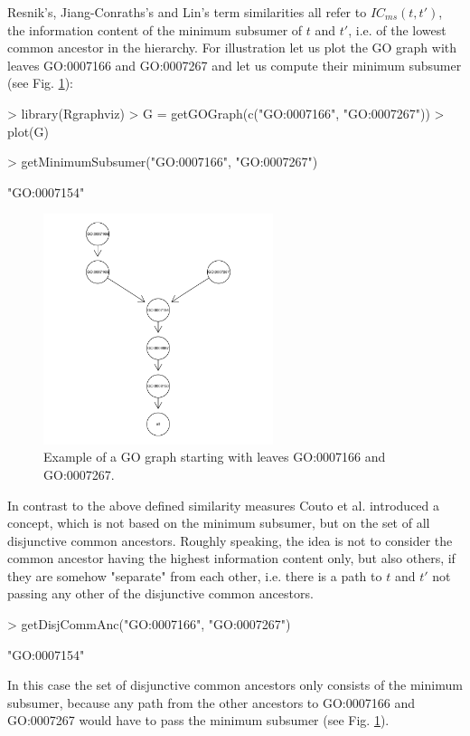 \documentclass[12pt,a4paper]{article}
\begin{document}
Resnik's, Jiang-Conraths's and Lin's term similarities all refer to $IC_{ms}(t,t')$, the information content of the minimum subsumer of $t$ and $t'$, i.e. of the lowest common ancestor in the hierarchy. For illustration let us plot the GO graph with leaves GO:0007166 and GO:0007267 and let us compute their minimum subsumer (see Fig. \ref{Fig:GOPlot}):
\begin{Schunk}
\begin{Sinput}
> library(Rgraphviz)
> G = getGOGraph(c("GO:0007166", "GO:0007267"))
> plot(G)
\end{Sinput}
\end{Schunk}
\begin{Schunk}
\begin{Sinput}
> getMinimumSubsumer("GO:0007166", "GO:0007267")
\end{Sinput}
\begin{Soutput}
[1] "GO:0007154"
\end{Soutput}
\end{Schunk}

\begin{figure}
\begin{center}
\includegraphics[width=0.6\textwidth]{GOExample.pdf}
\caption{\label{Fig:GOPlot}Example of a GO graph starting with leaves GO:0007166 and GO:0007267.}
\end{center}
\end{figure}

In contrast to the above defined similarity measures Couto et al. \cite{Couto2005GraSM} introduced a concept, which is not based on the minimum subsumer, but on the set of all disjunctive common ancestors. Roughly speaking, the idea is not to consider the common ancestor having the highest information content only, but also others, if they are somehow "separate" from each other, i.e. there is a path to $t$ and $t'$ not passing any other of the disjunctive common ancestors.
\begin{Schunk}
\begin{Sinput}
> getDisjCommAnc("GO:0007166", "GO:0007267")
\end{Sinput}
\begin{Soutput}
[1] "GO:0007154"
\end{Soutput}
\end{Schunk}
In this case the set of disjunctive common ancestors only consists of the minimum subsumer, because any path from the other ancestors to GO:0007166 and GO:0007267 would have to pass the minimum subsumer (see Fig. \ref{Fig:GOPlot}).
\end{document}
